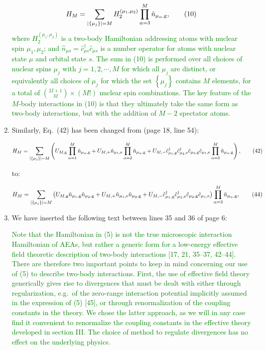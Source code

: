 \documentclass[preprint,showkeys,nofootinbib]{revtex4-1}
\newcommand{\p}[1]{\left(#1\right)} %
\renewcommand{\set}[1]{\left\{#1\right\}} %
\newcommand{\g}{\text{g}}
\newcommand{\e}{\text{e}}
\renewcommand{\c}{\hat{c}}
\newcommand{\n}{\hat{n}}
\newcommand{\1}{\mathds{1}}
\newcommand{\red}[1]{\textcolor{red}{#1}}
\newcommand{\green}[1]{\textcolor{green}{#1}}
\newcounter{point}
\newcommand{\step}{\stepcounter{point}\setcounter{enumi}{0}}
\begin{document}
\begin{enumerate}[label=(R1.\arabic{point}.\arabic*)]
  \green{\begin{align*}
      H_M = \sum_{\abs{\set{\mu_j}}=M}
      H_2^{(\mu_1,\mu_2)} \prod_{\alpha=3}^M \n_{\mu_\alpha,\g},
      \tag{10}
    \end{align*}
    where $H_2^{(\mu_1,\mu_2)}$ is a two-body Hamiltonian addressing
    atoms with nuclear spin $\mu_1,\mu_2$; and
    $\n_{\mu s}=\c_{\mu s}^\dag\c_{\mu s}$ is a number operator for
    atoms with nuclear state $\mu$ and orbital state $s$.  The sum in
    (10) is performed over all choices of nuclear spins $\mu_j$ with
    $j=1,2,\cdots,M$ for which all $\mu_j$ are distinct, or
    equivalently all choices of $\mu_j$ for which the set
    $\set{\mu_j}$ contains $M$ elements, for a total of
    ${2I+1\choose M}\times\p{M!}$ nuclear spin combinations.  The key
    feature of the $M$-body interactions in (10) is that they
    ultimately take the same form as two-body interactions, but with
    the addition of $M-2$ spectator atoms.}


\item Similarly, Eq.~(42) has been changed from (page 18, line 54):

  \red{\begin{align*}
      H_M = \sum_{\abs{\set{\mu_j}}=M}
      \p{U_{M,\g} \prod_{\alpha=1}^M \n_{\mu_\alpha,\g}
        + U_{M,+} \n_{\mu_1,\e} \prod_{\alpha=2}^M \n_{\mu_\alpha,\g}
        + U_{M,-} \c_{\mu_1,\g}^\dag \c_{\mu_2,\e}^\dag
        \c_{\mu_2,\g} \c_{\mu_1,\e} \prod_{\alpha=3}^M \n_{\mu_\alpha,\g}},
      \tag{42}
    \end{align*}}

  to:

  \green{\begin{align*}
      H_M = \sum_{\abs{\set{\mu_j}}=M}
      \p{U_{M,\g} \n_{\mu_1,\g} \n_{\mu_2,\g}
        + U_{M,+} \n_{\mu_1,\e} \n_{\mu_2,\g}
        + U_{M,-} \c_{\mu_1,\g}^\dag \c_{\mu_2,\e}^\dag
        \c_{\mu_2,\g} \c_{\mu_1,\e}}
      \prod_{\alpha=3}^M \n_{\mu_\alpha,\g},
      \tag{44}
    \end{align*}}


  \step
\item We have inserted the following text between lines 35 and 36 of
  page 6:

  \green{Note that the Hamiltonian in (5) is not the true microscopic
    interaction Hamiltonian of AEAs, but rather a generic form for a
    low-energy effective field theoretic description of two-body
    interactions [17, 21, 35--37, 42--44].  There are therefore two
    important points to keep in mind concerning our use of (5) to
    describe two-body interactions.  First, the use of effective field
    theory generically gives rise to divergences that must be dealt
    with either through regularization, e.g.~of the zero-range
    interaction potential implicitly assumed in the expression of (5)
    [45], or through renormalization of the coupling constants in the
    theory.  We chose the latter approach, as we will in any case find
    it convenient to renormalize the coupling constants in the
    effective theory developed in section III.  The choice of method
    to regulate divergences has no effect on the underlying physics.}


\end{enumerate}
\end{document}
